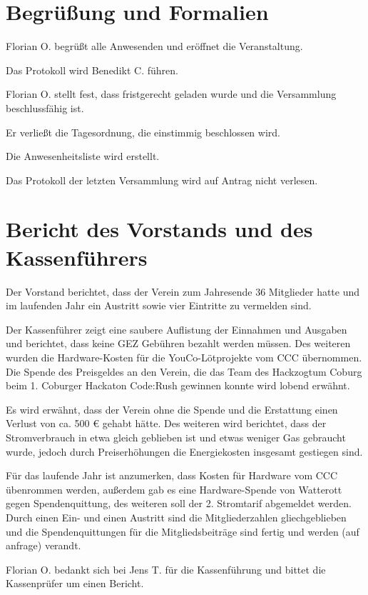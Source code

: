 \section{Begrüßung und Formalien}
Florian O. begrüßt alle Anwesenden und eröffnet die Veranstaltung. 

Das Protokoll wird Benedikt C. führen.

Florian O. stellt fest, dass fristgerecht geladen wurde und die Versammlung beschlussfähig ist. 

Er verließt die Tagesordnung, die einstimmig beschlossen wird.

Die Anwesenheitsliste wird erstellt.

Das Protokoll der letzten Versammlung wird auf Antrag nicht verlesen. 


\section{Bericht des Vorstands und des Kassenführers}
Der Vorstand berichtet, dass der Verein zum Jahresende 36 Mitglieder hatte und im laufenden Jahr ein Austritt sowie vier Eintritte zu vermelden sind.

Der Kassenführer zeigt eine saubere Auflistung der Einnahmen und Ausgaben und berichtet, dass keine GEZ Gebühren bezahlt werden müssen.
Des weiteren wurden die Hardware-Kosten für die YouCo-Lötprojekte vom CCC übernommen.
Die Spende des Preisgeldes an den Verein, die das Team des Hackzogtum Coburg beim 1. Coburger Hackaton Code:Rush gewinnen konnte wird lobend erwähnt.

Es wird erwähnt, dass der Verein ohne die Spende und die Erstattung einen Verlust von ca. 500 € gehabt hätte.
Des weiteren wird berichtet, dass der Stromverbrauch in etwa gleich geblieben ist und etwas weniger Gas gebraucht wurde, jedoch durch Preiserhöhungen die Energiekosten insgesamt gestiegen sind.

Für das laufende Jahr ist anzumerken, dass Kosten für Hardware vom CCC übenrommen werden, außerdem gab es eine Hardware-Spende von Watterott gegen Spendenquittung, des weiteren soll der 2. Stromtarif abgemeldet werden. Durch einen Ein- und einen Austritt sind die Mitgliederzahlen gliechgeblieben und die Spendenquittungen für die Mitgliedsbeiträge sind fertig und werden (auf anfrage) verandt.

Florian O. bedankt sich bei Jens T. für die Kassenführung und bittet die Kassenprüfer um einen Bericht.



